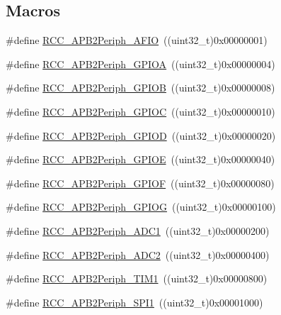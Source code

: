 \subsection*{Macros}
\begin{DoxyCompactItemize}
\item 
\#define \hyperlink{group___a_p_b2__peripheral_ga5aa9469879ffa019d4836b0d297104c5}{R\+C\+C\+\_\+\+A\+P\+B2\+Periph\+\_\+\+A\+F\+IO}~((uint32\+\_\+t)0x00000001)
\item 
\#define \hyperlink{group___a_p_b2__peripheral_ga44b92fbf2e288796b1acbce2708f3636}{R\+C\+C\+\_\+\+A\+P\+B2\+Periph\+\_\+\+G\+P\+I\+OA}~((uint32\+\_\+t)0x00000004)
\item 
\#define \hyperlink{group___a_p_b2__peripheral_ga8c8909c3640508e9ce31dff80010a6dd}{R\+C\+C\+\_\+\+A\+P\+B2\+Periph\+\_\+\+G\+P\+I\+OB}~((uint32\+\_\+t)0x00000008)
\item 
\#define \hyperlink{group___a_p_b2__peripheral_gaf1f4b467becee1ff31ba2c54328a0115}{R\+C\+C\+\_\+\+A\+P\+B2\+Periph\+\_\+\+G\+P\+I\+OC}~((uint32\+\_\+t)0x00000010)
\item 
\#define \hyperlink{group___a_p_b2__peripheral_ga177200a365084af306e98389edeba42b}{R\+C\+C\+\_\+\+A\+P\+B2\+Periph\+\_\+\+G\+P\+I\+OD}~((uint32\+\_\+t)0x00000020)
\item 
\#define \hyperlink{group___a_p_b2__peripheral_gabc736c9892278ccd15848c6137d991fc}{R\+C\+C\+\_\+\+A\+P\+B2\+Periph\+\_\+\+G\+P\+I\+OE}~((uint32\+\_\+t)0x00000040)
\item 
\#define \hyperlink{group___a_p_b2__peripheral_ga2dbb1e1116b57621c585e1b52c894bda}{R\+C\+C\+\_\+\+A\+P\+B2\+Periph\+\_\+\+G\+P\+I\+OF}~((uint32\+\_\+t)0x00000080)
\item 
\#define \hyperlink{group___a_p_b2__peripheral_gaba82756d2060b97c62eb555242361b2e}{R\+C\+C\+\_\+\+A\+P\+B2\+Periph\+\_\+\+G\+P\+I\+OG}~((uint32\+\_\+t)0x00000100)
\item 
\#define \hyperlink{group___a_p_b2__peripheral_gacd24acb2cd5ca208652157f6c13d3145}{R\+C\+C\+\_\+\+A\+P\+B2\+Periph\+\_\+\+A\+D\+C1}~((uint32\+\_\+t)0x00000200)
\item 
\#define \hyperlink{group___a_p_b2__peripheral_ga4fd76e573e827702568d6064e33448b5}{R\+C\+C\+\_\+\+A\+P\+B2\+Periph\+\_\+\+A\+D\+C2}~((uint32\+\_\+t)0x00000400)
\item 
\#define \hyperlink{group___a_p_b2__peripheral_ga0d9babf212897db0b3aa852f8a71160b}{R\+C\+C\+\_\+\+A\+P\+B2\+Periph\+\_\+\+T\+I\+M1}~((uint32\+\_\+t)0x00000800)
\item 
\#define \hyperlink{group___a_p_b2__peripheral_ga289cc086580f4b6a080ea0ed3dd4a7af}{R\+C\+C\+\_\+\+A\+P\+B2\+Periph\+\_\+\+S\+P\+I1}~((uint32\+\_\+t)0x00001000)

\end{DoxyCompactItemize}

